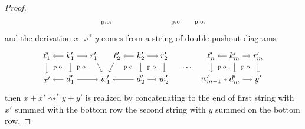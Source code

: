 \documentclass{amsart}
\newcommand{\deriv}[2]{#1 \rightsquigarrow^\ast #2}
\theoremstyle{remark}
\theoremstyle{definition}
\begin{document}
\begin{proof}
\[\begin{tikzpicture}
      \node () at (4.5,0.5) {\scriptsize{p.o.}};
      \node () at (7.5,0.5) {\scriptsize{p.o.}};
      \node () at (8.5,0.5) {\scriptsize{p.o.}};
    \end{tikzpicture}
  \]
  and the derivation $ \deriv{x}{y} $ comes from a string of double
  pushout diagrams
  \[
    \begin{tikzpicture}
      \node (1t) at (0,1) {$ \ell'_1 $};
      \node (2t) at (1,1) {$ k'_1 $};
      \node (3t) at (2,1) {$ r'_1 $};
      \node (4t) at (3,1) {$ \ell'_2 $};
      \node (5t) at (4,1) {$ k'_2 $};
      \node (6t) at (5,1) {$ r'_2 $};
      \node (7t) at (7,1) {$ \ell'_n $};
      \node (8t) at (8,1) {$ k'_m $};
      \node (9t) at (9,1) {$ r'_m $};
      \node (1b) at (0,0) {$ x' $};
      \node (2b) at (1,0) {$ d'_1 $};
      \node (3b) at (2.5,0) {$ w'_1 $};
      \node (4b) at (4,0) {$ d'_2 $};
      \node (5b) at (5,0) {$ w'_2 $};
      \node (6b) at (7,0) {$ w'_{m-1} $};
      \node (7b) at (8,0) {$ d'_m $};
      \node (8b) at (9,0) {$ y' $};
      \draw [->] (2t) to node [] {\scriptsize{$  $}} (1t);
      \draw [->] (2t) to node [] {\scriptsize{$  $}} (3t);
      \draw [->] (5t) to node [] {\scriptsize{$  $}} (4t);
      \draw [->] (5t) to node [] {\scriptsize{$  $}} (6t);
      \draw [->] (8t) to node [] {\scriptsize{$  $}} (7t);
      \draw [->] (8t) to node [] {\scriptsize{$  $}} (9t);
      \draw [->] (2b) to node [] {\scriptsize{$  $}} (1b);
      \draw [->] (2b) to node [] {\scriptsize{$  $}} (3b);
      \draw [->] (4b) to node [] {\scriptsize{$  $}} (3b);
      \draw [->] (4b) to node [] {\scriptsize{$  $}} (5b);
      \draw [->] (7b) to node [] {\scriptsize{$  $}} (6b);
      \draw [->] (7b) to node [] {\scriptsize{$  $}} (8b);
      \draw [->] (1t) to node [] {\scriptsize{$  $}} (1b);
      \draw [->] (2t) to node [] {\scriptsize{$  $}} (2b);
      \draw [->] (3t) to node [] {\scriptsize{$  $}} (3b);
      \draw [->] (4t) to node [] {\scriptsize{$  $}} (3b);
      \draw [->] (5t) to node [] {\scriptsize{$  $}} (4b);
      \draw [->] (6t) to node [] {\scriptsize{$  $}} (5b);
      \draw [->] (7t) to node [] {\scriptsize{$  $}} (6b);
      \draw [->] (8t) to node [] {\scriptsize{$  $}} (7b);
      \draw [->] (9t) to node [] {\scriptsize{$  $}} (8b);
      \node () at (6,0.5) {$ \dotsm $};
      \node () at (0.5,0.5) {\scriptsize{p.o.}};
      \node () at (1.5,0.5) {\scriptsize{p.o.}};
      \node () at (3.5,0.5) {\scriptsize{p.o.}};
      \node () at (4.5,0.5) {\scriptsize{p.o.}};
      \node () at (7.5,0.5) {\scriptsize{p.o.}};
      \node () at (8.5,0.5) {\scriptsize{p.o.}};
    \end{tikzpicture}
  \]
  then $ \deriv{x+x'}{y+y'} $ is realized by concatenating to the end
  of first string with $ x' $ summed with the bottom row the second
  string with $ y $ summed on the bottom row.
\end{proof}
\end{document}

